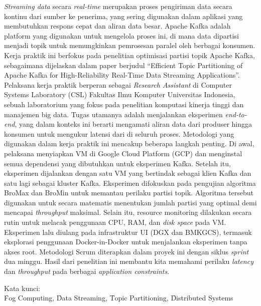 \noindent \textit{Streaming data} secara \textit{real-time} merupakan proses pengiriman data secara kontinu dari sumber ke penerima, yang sering digunakan dalam aplikasi yang membutuhkan respons cepat dan aliran data besar. Apache Kafka adalah platform yang digunakan untuk mengelola proses ini, di mana data dipartisi menjadi topik untuk memungkinkan pemrosesan paralel oleh berbagai konsumen. Kerja praktik ini berfokus pada penelitian optimisasi partisi topik Apache Kafka, sebagaimana dijelaskan dalam paper berjudul ``Efficient Topic Partitioning of Apache Kafka for High-Reliability Real-Time Data Streaming Applications''. Pelaksana kerja praktik berperan sebagai \textit{Research Assistant} di Computer Systems Laboratory (CSL) Fakultas Ilmu Komputer Universitas Indonesia, sebuah laboratorium yang fokus pada penelitian komputasi kinerja tinggi dan manajemen big data. Tugas utamanya adalah menjalankan eksperimen \textit{end-to-end}, yang dalam konteks ini berarti mengamati aliran data dari produser hingga konsumen untuk mengukur latensi dari di seluruh proses. Metodologi yang digunakan dalam kerja praktik ini mencakup beberapa langkah penting. Di awal, pelaksana menyiapkan VM di Google Cloud Platform (GCP) dan menginstal semua dependensi yang dibutuhkan untuk eksperimen Kafka. Setelah itu, eksperimen dijalankan dengan satu VM yang bertindak sebagai klien Kafka dan satu lagi sebagai kluster Kafka. Eksperimen difokuskan pada pengujian algoritma BroMax dan BroMin untuk memantau perilaku partisi topik. Algoritma tersebut digunakan untuk secara matematis menentukan jumlah partisi yang optimal demi mencapai \textit{throughput} maksimal. Selain itu, resource monitoring dilakukan secara rutin untuk melacak penggunaan CPU, RAM, dan \textit{disk space} pada VM. Eksperimen lalu diulang pada infrastruktur UI (DGX dan BMKGCS), termasuk eksplorasi penggunaan Docker-in-Docker untuk menjalankan eksperimen tanpa akses root. Metodologi Scrum diterapkan dalam proyek ini dengan siklus \textit{sprint} dua minggu. Hasil dari penelitian ini membantu kita memahami perilaku \textit{latency} dan \textit{throughput} pada berbagai \textit{application constraints}. \\

\vspace*{0.2cm}

\noindent Kata kunci: \\ \f{Fog Computing}, \f{Data Streaming}, \f{Topic Partitioning}, \f{Distributed Systems} \\

\newpage
